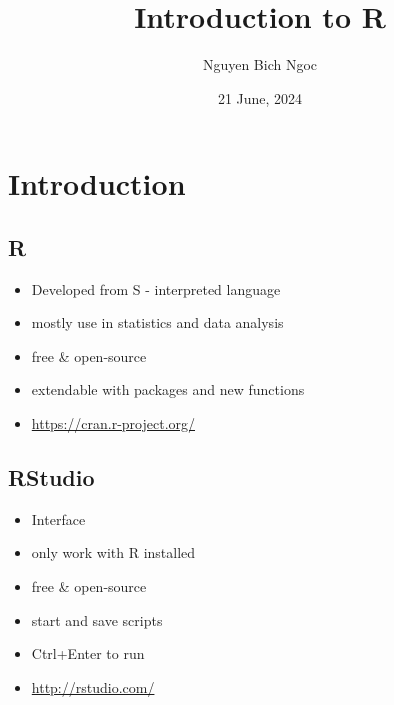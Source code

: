 \documentclass[
  a4paper,
]{article}
\title{Introduction to R}
\author{Nguyen Bich Ngoc}
\date{21 June, 2024}
\newenvironment{Shaded}{\begin{snugshade}}{\end{snugshade}}
\newcommand{\AttributeTok}[1]{\textcolor[rgb]{0.13,0.29,0.53}{#1}}
\newcommand{\ConstantTok}[1]{\textcolor[rgb]{0.56,0.35,0.01}{#1}}
\newcommand{\DecValTok}[1]{\textcolor[rgb]{0.00,0.00,0.81}{#1}}
\newcommand{\FunctionTok}[1]{\textcolor[rgb]{0.13,0.29,0.53}{\textbf{#1}}}
\newcommand{\NormalTok}[1]{#1}
\newcommand{\SpecialCharTok}[1]{\textcolor[rgb]{0.81,0.36,0.00}{\textbf{#1}}}
\providecommand{\tightlist}{%
  \setlength{\itemsep}{0pt}\setlength{\parskip}{0pt}}
\begin{document}
\maketitle

\begin{Shaded}
\end{Shaded}

\section{Introduction}\label{introduction}

\subsection{R}\label{r}

\begin{itemize}
\tightlist
\item
  Developed from S - interpreted language
\item
  mostly use in statistics and data analysis
\item
  free \& open-source
\item
  extendable with packages and new functions
\item
  \url{https://cran.r-project.org/}
\end{itemize}

\subsection{RStudio}\label{rstudio}

\begin{itemize}
\tightlist
\item
  Interface
\item
  only work with R installed
\item
  free \& open-source
\item
  start and save scripts
\item
  Ctrl+Enter to run
\item
  \url{http://rstudio.com/}
\end{itemize}
\end{document}
